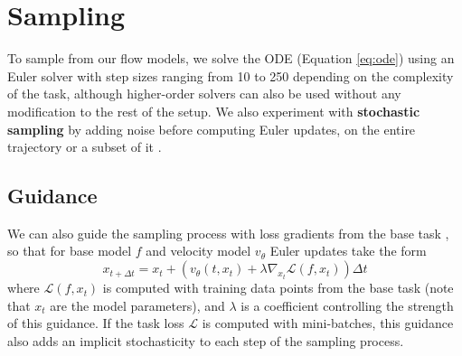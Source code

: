 \section{Sampling}

To sample from our flow models, we solve the ODE (Equation \ref{eq:ode}) using an Euler solver with step sizes ranging from 10 to 250 depending on the complexity of the task, although higher-order solvers can also be used without any modification to the rest of the setup. We also experiment with \textbf{stochastic sampling} by adding noise before computing Euler updates, on the entire trajectory or a subset of it \citep{karrasElucidatingDesignSpace}. 

\subsection{Guidance}

We can also guide the sampling process with loss gradients from the base task \citep{wangProteinConformationGeneration2024,kulyteImprovingAntibodyDesign2024,yuForceGuidedBridgeMatching2024a}, so that for base model $f$ and velocity model $v_\theta$ Euler updates take the form 
\begin{equation}
    x_{t + \Delta t} = x_t + \left( v_\theta(t, x_t) + \lambda \nabla_{x_t}\mathcal{L}(f, x_t) \right) \Delta t
\end{equation}
where $\mathcal{L}(f, x_t)$ is computed with training data points from the base task (note that $x_t$ are the model parameters), and $\lambda$ is a coefficient controlling the strength of this guidance. If the task loss $\mathcal{L}$ is computed with mini-batches, this guidance also adds an implicit stochasticity to each step of the sampling process. 

